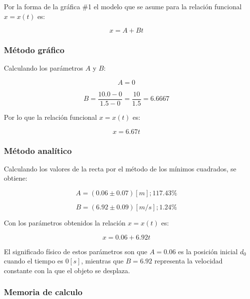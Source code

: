 \documentclass[letter,11pt]{article}
\begin{document}
Por la forma de la gráfica \#1 el modelo que se asume para la relación funcional
$x = x(t)$ es:

\begin{equation*}
    x = A + B t
\end{equation*}

\subsubsection{Método gráfico}

Calculando los parámetros $A$ y $B$:

\begin{equation*}
    A = 0
\end{equation*}

\begin{equation*}
    B = \frac{10.0-0}{1.5-0} = \frac{10}{1.5} = 6.6667
\end{equation*}

Por lo que la relación funcional $x = x(t)$ es:

\begin{equation}
    x = 6.67 t
\end{equation}

\subsubsection{Método analítico}

Calculando los valores de la recta por el método de los mínimos cuadrados, se
obtiene:

\begin{equation*}
    A = (0.06 \pm 0.07)[m];117.43\%
\end{equation*}

\begin{equation*}
    B = (6.92 \pm 0.09)[m/s];1.24\%
\end{equation*}

Con los parámetros obtenidos la relación $x = x(t)$ es:

\begin{equation}
    x = 0.06 + 6.92 t
\end{equation}

El significado físico de estos parámetros son que $A = 0.06$ es la posición
inicial $d_0$ cuando el tiempo es $0 [s]$, mientras que $B = 6.92$ representa la
velocidad constante con la que el objeto se desplaza.

\subsubsection{Memoria de calculo}
\end{document}
